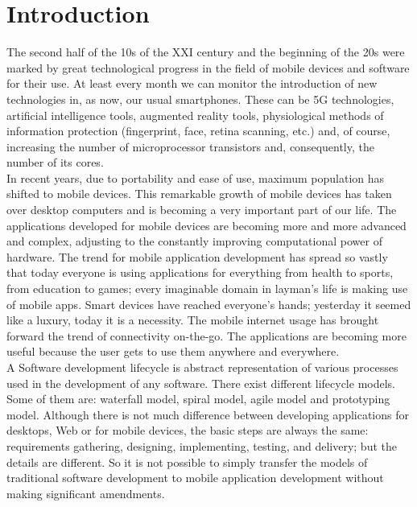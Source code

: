 \documentclass[10pt,slovak,a4paper]{article}
\begin{document}
\section{Introduction}
The second half of the 10s of the XXI century and the beginning of the 20s were marked by great technological progress in the field of mobile devices and software for their use. At least every month we can monitor the introduction of new technologies in, as now, our usual smartphones. These can be 5G technologies, artificial intelligence tools, augmented reality tools, physiological methods of information protection (fingerprint, face, retina scanning, etc.) and, of course, increasing the number of microprocessor transistors and, consequently, the number of its cores.
\\
In recent years, due to portability and ease of use, maximum population has shifted to mobile devices. This remarkable growth of mobile devices has taken over desktop computers and is becoming a very important part of our life. The applications developed for mobile devices are becoming more and more advanced and complex,  adjusting to the constantly improving computational power of hardware.
The trend for mobile application development has spread so vastly that today everyone is using applications for everything from health to sports, from education to games; every imaginable domain in layman’s life is making use of mobile apps. Smart devices have reached everyone’s hands; yesterday it seemed like a luxury, today it is a necessity. The mobile internet usage has brought forward the trend of connectivity on-the-go. The applications are becoming more useful because the user gets to use them anywhere and everywhere.
\\
A Software development lifecycle is abstract representation of various processes used in the development of any software. There exist different lifecycle models. Some of them are: waterfall model, spiral model, agile model and prototyping model. Although there is not much difference between developing applications for desktops, Web or for mobile devices, the basic steps are always the same: requirements gathering, designing, implementing, testing, and delivery; but the details are different. So it is not possible to simply transfer the models of traditional software development to mobile application development without making significant amendments\cite{kaur2015suitability}.
\end{document}
